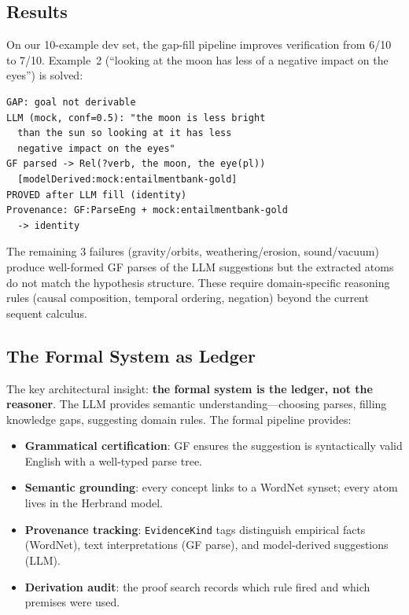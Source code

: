 \documentclass[]{article}
\newcommand{\code}[1]{\texttt{#1}}
\begin{document}
\subsection{Results}

On our 10-example dev set, the gap-fill pipeline improves
verification from 6/10 to 7/10.  Example~2 (``looking at the moon
has less of a negative impact on the eyes'') is solved:

\begin{lstlisting}
GAP: goal not derivable
LLM (mock, conf=0.5): "the moon is less bright
  than the sun so looking at it has less
  negative impact on the eyes"
GF parsed -> Rel(?verb, the moon, the eye(pl))
  [modelDerived:mock:entailmentbank-gold]
PROVED after LLM fill (identity)
Provenance: GF:ParseEng + mock:entailmentbank-gold
  -> identity
\end{lstlisting}

The remaining 3 failures (gravity/orbits, weathering/erosion,
sound/vacuum) produce well-formed GF parses of the LLM suggestions
but the extracted atoms do not match the hypothesis structure.
These require domain-specific reasoning rules (causal composition,
temporal ordering, negation) beyond the current sequent calculus.

\subsection{The Formal System as Ledger}

The key architectural insight: \textbf{the formal system is the ledger,
not the reasoner}.  The LLM provides semantic understanding---choosing
parses, filling knowledge gaps, suggesting domain rules.  The formal
pipeline provides:
\begin{itemize}
\item \textbf{Grammatical certification}: GF ensures the suggestion
  is syntactically valid English with a well-typed parse tree.
\item \textbf{Semantic grounding}: every concept links to a WordNet
  synset; every atom lives in the Herbrand model.
\item \textbf{Provenance tracking}: \code{EvidenceKind} tags
  distinguish empirical facts (WordNet), text interpretations
  (GF parse), and model-derived suggestions (LLM).
\item \textbf{Derivation audit}: the proof search records which
  rule fired and which premises were used.
\end{itemize}
\end{document}

